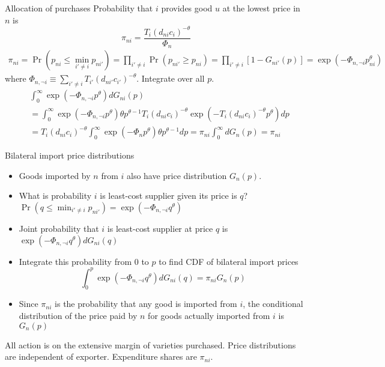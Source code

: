 \documentclass[11pt,notes=hide,aspectratio=169]{beamer}
\begin{document}
\begin{frame}{Allocation of purchases}
Probability that $i$ provides good $u$ at the lowest price in $n$ is
\begin{equation*}
\pi_{ni}=\frac{T_{i}\left(d_{ni}c_{i}\right) ^{-\theta}}{\Phi_{n}}
\end{equation*}
\begin{align*}
\pi_{ni}
 = \Pr\left(p_{ni} \leq \min_{i'\neq i} p_{ni'}\right) 
 = \prod_{i' \neq i} \Pr \left(p_{ni'} \geq p_{ni}\right)
 = \prod_{i' \neq i} \left[1 - G_{ni'}(p)\right]
 = \exp\left(-\Phi_{n,\neg i}p_{ni}^{\theta}\right)
\end{align*}
where $\Phi_{n,\neg i} \equiv {\sum_{i' \neq i}T_{i'}\left(d_{ni'}c_{i'}\right) ^{-\theta}}$.
Integrate over all $p$. %
\begin{align*}
&\int_{0}^{\infty} \exp\left(-\Phi_{n,\neg i}p^{\theta}\right) dG_{ni}(p) \\
&=
\int_{0}^{\infty} \exp\left(-\Phi_{n,\neg i}p^{\theta}\right) \theta p^{\theta-1} T_{i}\left( d _{ni}c_{i}\right) ^{-\theta} \exp \left( -T_{i}\left( d _{ni}c_{i}\right) ^{-\theta}p^{\theta}\right) dp \\
&=
T_{i}\left(d _{ni}c_{i}\right)^{-\theta}
\int_{0}^{\infty} \exp\left(-\Phi_{n}p^{\theta}\right) \theta p^{\theta-1} dp
= \pi_{ni} \int_{0}^{\infty} dG_n(p) = \pi_{ni}
\end{align*}
\end{frame}
\begin{frame}{Bilateral import price distributions}
\begin{itemize}
	\item Goods imported by $n$ from $i$ also have price distribution $G_n(p)$.
	\item What is probability $i$ is least-cost supplier given its price is $q$? 
	$\Pr\left(q \leq \min_{i'\neq i} p_{ni'}\right) = \exp\left(-\Phi_{n,\neg i}q^{\theta}\right)$
	\item Joint probability that $i$ is least-cost supplier at price $q$ is
	$\exp\left(-\Phi_{n,\neg i}q^{\theta}\right)d G_{ni}(q)$
	\item Integrate this probability from $0$ to $p$ to find CDF of bilateral import prices
	\begin{equation*}
	\int_{0}^{p} \exp\left(-\Phi_{n,\neg i}q^{\theta}\right)d G_{ni}(q)
	= \pi_{ni} G_n(p)
	\end{equation*}
	\item Since $\pi_{ni}$ is the probability that any good is imported from $i$, the conditional distribution of the price paid by $n$ for goods actually imported from $i$ is $G_n(p)$
\end{itemize}
All action is on the extensive margin of varieties purchased. Price distributions are independent of exporter. Expenditure shares are $\pi_{ni}$.
\end{frame}
\end{document}
